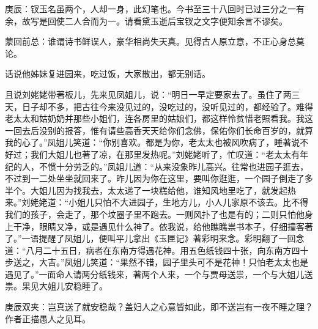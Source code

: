 

\begin{parag}
    \begin{note}庚辰：钗玉名虽两个，人却一身，此幻笔也。今书至三十八回时已过三分之一有余，故写是回使二人合而为一。请看黛玉逝后宝钗之文字便知余言不谬矣。\end{note}
\end{parag}


\begin{parag}
    \begin{note}蒙回前总：谁谓诗书鲜误人，豪华相尚失天真。见得古人原立意，不正心身总莫论。\end{note}
\end{parag}


\begin{parag}
    话说他姊妹复进园来，吃过饭，大家散出，都无别话。
\end{parag}


\begin{parag}
    且说刘姥姥带著板儿，先来见凤姐儿，说：“明日一早定要家去了。虽住了两三天，日子却不多，把古往今来没见过的，没吃过的，没听见过的，都经验了。难得老太太和姑奶奶并那些小姐们，连各房里的姑娘们，都这样怜贫惜老照看我。我这一回去后没别的报答，惟有请些高香天天给你们念佛，保佑你们长命百岁的，就算我的心了。”凤姐儿笑道：“你别喜欢。都是为你，老太太也被风吹病了，睡著说不好过；我们大姐儿也著了凉，在那里发热呢。”刘姥姥听了，忙叹道：“老太太有年纪的人，不惯十分劳乏的。”凤姐儿道：“从来没象昨儿高兴。往常也进园子逛去，不过到一二处坐坐就回来了。昨儿因为你在这里，要叫你逛逛，一个园子倒走了多半个。大姐儿因为找我去，太太递了一块糕给他，谁知风地里吃了，就发起热来。”刘姥姥道：“小姐儿只怕不大进园子，生地方儿，小人儿家原不该去。比不得我们的孩子，会走了，那个坟圈子里不跑去。一则风扑了也是有的；二则只怕他身上干净，眼睛又净，或是遇见什么神了。依我说，给他瞧瞧祟书本子，仔细撞客著了。”一语提醒了凤姐儿，便叫平儿拿出《玉匣记》著彩明来念。彩明翻了一回念道：“八月二十五日，病者在东南方得遇花神。用五色纸钱四十张，向东南方四十步送之，大吉。”凤姐儿笑道：“果然不错，园子里头可不是花神！只怕老太太也是遇见了。”一面命人请两分纸钱来，著两个人来，一个与贾母送祟，一个与大姐儿送祟。果见大姐儿安稳睡了。\begin{note}庚辰双夹：岂真送了就安稳哉？盖妇人之心意皆如此，即不送岂有一夜不睡之理？作者正描愚人之见耳。\end{note}
\end{parag}



